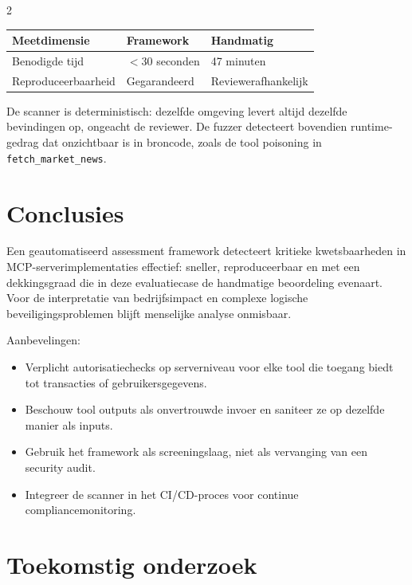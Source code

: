 \documentclass[a0,portrait]{hogent-poster}
\begin{document}
\begin{multicols}{2}
\begin{center}
  \captionsetup{type=table}
  \begin{tabular}{@{}lll@{}}
    \toprule
    \textbf{Meetdimensie}   & \textbf{Framework} & \textbf{Handmatig} \\ \midrule
    Benodigde tijd          & $<$30 seconden     & 47 minuten \\
    Reproduceerbaarheid     & Gegarandeerd       & Reviewerafhankelijk \\ \bottomrule
  \end{tabular}
\end{center}

De scanner is deterministisch: dezelfde omgeving levert altijd dezelfde bevindingen op, ongeacht de reviewer. De fuzzer detecteert bovendien runtime-gedrag dat onzichtbaar is in broncode, zoals de tool poisoning in \texttt{fetch\_market\_news}.

\section{Conclusies}

Een geautomatiseerd assessment framework detecteert kritieke kwetsbaarheden in MCP-serverimplementaties effectief: sneller, reproduceerbaar en met een dekkingsgraad die in deze evaluatiecase de handmatige beoordeling evenaart. Voor de interpretatie van bedrijfsimpact en complexe logische beveiligingsproblemen blijft menselijke analyse onmisbaar.

Aanbevelingen:

\begin{itemize}
  \item Verplicht autorisatiechecks op serverniveau voor elke tool die toegang biedt tot transacties of gebruikersgegevens.
  \item Beschouw tool outputs als onvertrouwde invoer en saniteer ze op dezelfde manier als inputs.
  \item Gebruik het framework als screeningslaag, niet als vervanging van een security audit.
  \item Integreer de scanner in het CI/CD-proces voor continue compliancemonitoring.
\end{itemize}

\section{Toekomstig onderzoek}


\end{multicols}
\end{document}
